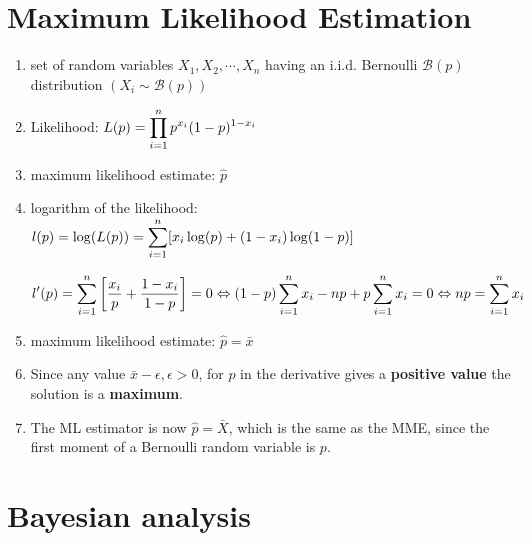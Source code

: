 \section{Maximum Likelihood Estimation \cite{ism-1}} \label{Bernoulli Distribution: Maximum Likelihood Estimation}

\begin{enumerate}[itemsep=0.2cm]
    \item set of random variables $X_1, X_2,\cdots, X_n$ having an i.i.d. Bernoulli $\mathcal{B}(p)$ distribution $(X_i \sim \mathcal{B}(p))$

    \item Likelihood: $
        L(p) = \displaystyle\prod_{i=1}^{n} p^{x_i} (1-p)^{1-x_i}
    $

    \item maximum likelihood estimate: $\hat{p}$

    \item logarithm of the likelihood: $
        l(p) = \log(L(p)) = \displaystyle\sum_{i=1}^{n} [{x_i}\log(p) + (1-x_i)\log(1-p)]
    $

    \[
        l'(p)
        = \displaystyle\sum_{i=1}^{n} \left[\dfrac{x_i}{p} + \dfrac{1-x_i}{1-p}\right]
        = 0
        \Leftrightarrow
        {(1-p)} \displaystyle\sum_{i=1}^{n} x_i - np + p \displaystyle\sum_{i=1}^{n} x_i = 0
        \Leftrightarrow
        np = \displaystyle\sum_{i=1}^{n} x_i
    \]

    \item maximum likelihood estimate: $\hat{p} = \bar{x}$

    \item Since any value $\bar{x} - \epsilon, \epsilon > 0$, for $p$ in the derivative gives a \textbf{positive value} the solution is a \textbf{maximum}. 
    
    \item The ML estimator is now $\hat{p} = \bar{X}$, which is the same as the MME, since the first moment of a Bernoulli random variable is $p$.

\end{enumerate}


\section{Bayesian analysis \cite{ism-1}} \label{Bernoulli Distribution: Bayesian analysis}

